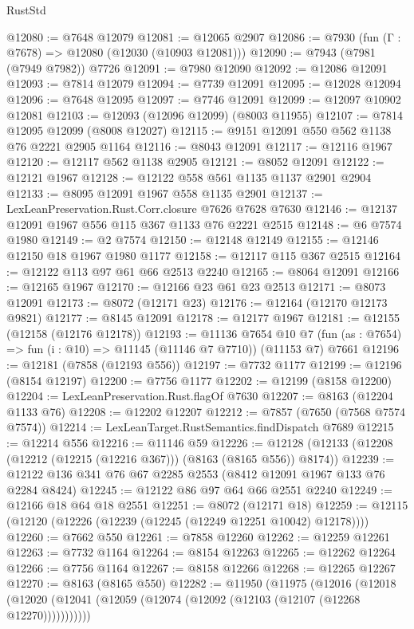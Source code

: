 \begin{lexlean}{RustStd}
\begin{coremodule}
{\begin{coremodule}
{{{{{{{{{{{{{{{{{{{{{{{{{{{{{{{{{{{{{{{{{{{{{{{{{{{{{@12080 := @7648 @12079
@12081 := @12065 @2907
@12086 := @7930 (fun (Γ : @7678) => @12080 (@12030 (@10903 @12081)))
@12090 := @7943 (@7981 (@7949 @7982)) @7726
@12091 := @7980 @12090
@12092 := @12086 @12091
@12093 := @7814 @12079
@12094 := @7739 @12091
@12095 := @12028 @12094
@12096 := @7648 @12095
@12097 := @7746 @12091
@12099 := @12097 @10902 @12081
@12103 := @12093 (@12096 @12099) (@8003 @11955)
@12107 := @7814 @12095 @12099 (@8008 @12027)
@12115 := @9151 @12091 @550 @562 @1138 @76 @2221 @2905 @1164
@12116 := @8043 @12091
@12117 := @12116 @1967
@12120 := @12117 @562 @1138 @2905
@12121 := @8052 @12091
@12122 := @12121 @1967
@12128 := @12122 @558 @561 @1135 @1137 @2901 @2904
@12133 := @8095 @12091 @1967 @558 @1135 @2901
@12137 := LexLeanPreservation.Rust.Corr.closure @7626 @7628 @7630
@12146 := @12137 @12091 @1967 @556 @115 @367 @1133 @76 @2221 @2515
@12148 := @6 @7574 @1980
@12149 := @2 @7574
@12150 := @12148 @12149
@12155 := @12146 @12150 @18 @1967 @1980 @1177
@12158 := @12117 @115 @367 @2515
@12164 := @12122 @113 @97 @61 @66 @2513 @2240
@12165 := @8064 @12091
@12166 := @12165 @1967
@12170 := @12166 @23 @61 @23 @2513
@12171 := @8073 @12091
@12173 := @8072 (@12171 @23)
@12176 := @12164 (@12170 @12173 @9821)
@12177 := @8145 @12091
@12178 := @12177 @1967
@12181 := @12155 (@12158 (@12176 @12178))
@12193 := @11136
    @7654
    @10
    @7
    (fun (as : @7654) => fun (i : @10) => @11145 (@11146 @7 @7710))
    (@11153 @7)
    @7661
@12196 := @12181 (@7858 (@12193 @556))
@12197 := @7732 @1177
@12199 := @12196 (@8154 @12197)
@12200 := @7756 @1177
@12202 := @12199 (@8158 @12200)
@12204 := LexLeanPreservation.Rust.flagOf @7630
@12207 := @8163 (@12204 @1133 @76)
@12208 := @12202 @12207
@12212 := @7857 (@7650 (@7568 @7574 @7574))
@12214 := LexLeanTarget.RustSemantics.findDispatch @7689
@12215 := @12214 @556
@12216 := @11146 @59
@12226 := @12128 (@12133 (@12208 (@12212 (@12215 (@12216 @367))) (@8163 (@8165 @556)) @8174))
@12239 := @12122 @136 @341 @76 @67 @2285 @2553 (@8412 @12091 @1967 @133 @76 @2284 @8424)
@12245 := @12122 @86 @97 @64 @66 @2551 @2240
@12249 := @12166 @18 @64 @18 @2551
@12251 := @8072 (@12171 @18)
@12259 := @12115 (@12120 (@12226 (@12239 (@12245 (@12249 @12251 @10042) @12178))))
@12260 := @7662 @550
@12261 := @7858 @12260
@12262 := @12259 @12261
@12263 := @7732 @1164
@12264 := @8154 @12263
@12265 := @12262 @12264
@12266 := @7756 @1164
@12267 := @8158 @12266
@12268 := @12265 @12267
@12270 := @8163 (@8165 @550)
@12282 := @11950
    (@11975
      (@12016
        (@12018 (@12020 (@12041 (@12059 (@12074 (@12092 (@12103 (@12107 (@12268 @12270)))))))))))
}}}}}}}}}}}}}}}}}}}}}}}}}}}}}}}}}}}}}}}}}}}}}}}}}}}}}
\end{coremodule}}
\end{coremodule}
\end{lexlean}
